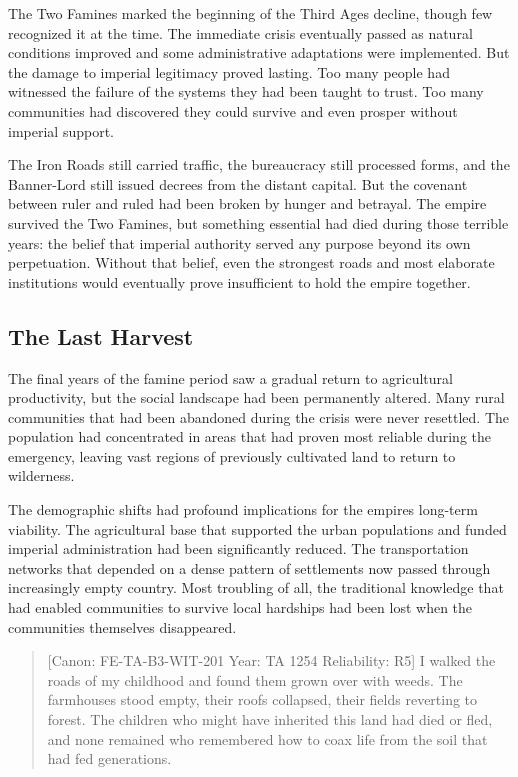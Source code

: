 The Two Famines marked the beginning of the Third Age\textquotesingle s
decline, though few recognized it at the time. The immediate crisis
eventually passed as natural conditions improved and some administrative
adaptations were implemented. But the damage to imperial legitimacy
proved lasting. Too many people had witnessed the failure of the systems
they had been taught to trust. Too many communities had discovered they
could survive and even prosper without imperial support.

The Iron Roads still carried traffic, the bureaucracy still processed
forms, and the Banner-Lord still issued decrees from the distant
capital. But the covenant between ruler and ruled had been broken by
hunger and betrayal. The empire survived the Two Famines, but something
essential had died during those terrible years: the belief that imperial
authority served any purpose beyond its own perpetuation. Without that
belief, even the strongest roads and most elaborate institutions would
eventually prove insufficient to hold the empire together.

\subsection{The Last Harvest}\label{the-last-harvest}

The final years of the famine period saw a gradual return to
agricultural productivity, but the social landscape had been permanently
altered. Many rural communities that had been abandoned during the
crisis were never resettled. The population had concentrated in areas
that had proven most reliable during the emergency, leaving vast regions
of previously cultivated land to return to wilderness.

The demographic shifts had profound implications for the
empire\textquotesingle s long-term viability. The agricultural base that
supported the urban populations and funded imperial administration had
been significantly reduced. The transportation networks that depended on
a dense pattern of settlements now passed through increasingly empty
country. Most troubling of all, the traditional knowledge that had
enabled communities to survive local hardships had been lost when the
communities themselves disappeared.

\begin{quote}
{[}Canon: FE-TA-B3-WIT-201 \textbar{} Year: TA 1254 \textbar{}
Reliability: R5{]} I walked the roads of my childhood and found them
grown over with weeds. The farmhouses stood empty, their roofs
collapsed, their fields reverting to forest. The children who might have
inherited this land had died or fled, and none remained who remembered
how to coax life from the soil that had fed generations.
\end{quote}

